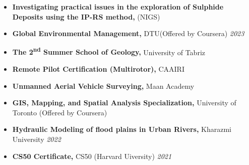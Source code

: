 \documentclass[letterpaper,11pt]{article}
\begin{document}
		\vspace{-1.2em}
		\begin{itemize}[left=0pt, label={}, topsep=7.5pt, partopsep=0pt, itemsep=6pt, parsep=0pt]
			\item \textbf{Investigating practical issues in the exploration of Sulphide Deposits using the IP-RS method,} (NIGS)\footnotemark[1]
		\end{itemize}
		\vspace{-1.2em}
		\begin{itemize}[left=0pt, label={}, topsep=7.5pt, partopsep=0pt, itemsep=6pt, parsep=0pt]
			\item \textbf{Global Environmental Management,} DTU\footnotemark[2] (Offered by Coursera)  \hfill \textit{2023}
		\end{itemize}
		\vspace{-1.2em}
		\begin{itemize}[left=0pt, label={}, topsep=7.5pt, partopsep=0pt, itemsep=6pt, parsep=0pt]
			\item \textbf{The 2\textsuperscript{nd} Summer School of Geology,} University of Tabriz\hfill \textit{}
		\end{itemize}
		\vspace{-1.2em}
		\begin{itemize}[left=0pt, label={}, topsep=7.5pt, partopsep=0pt, itemsep=6pt, parsep=0pt]
			\item \textbf{Remote Pilot Certification (Multirotor),} CAAIRI\footnotemark[3] \hfill \textit{}
		\end{itemize}
		\vspace{-1.2em}
		\begin{itemize}[left=0pt, label={}, topsep=7.5pt, partopsep=0pt, itemsep=6pt, parsep=0pt]
			\item \textbf{Unmanned Aerial Vehicle Surveying,} Maan Academy  \hfill \textit{}
		\end{itemize}
		\vspace{-1.2em}
		\begin{itemize}[left=0pt, label={}, topsep=7.5pt, partopsep=0pt, itemsep=6pt, parsep=0pt]
			\item \textbf{GIS, Mapping, and Spatial Analysis Specialization,} University of Toronto (Offered by Coursera) \hfill \textit{}
		\end{itemize}
		\vspace{-1.2em}
		\begin{itemize}[left=0pt, label={}, topsep=7.5pt, partopsep=0pt, itemsep=6pt, parsep=0pt]
			\item \textbf{Hydraulic Modeling of flood plains in Urban Rivers,}  Kharazmi University \hfill \textit{2022}
		\end{itemize}
		\vspace{-1.2em}
		\begin{itemize}[left=0pt, label={}, topsep=7.5pt, partopsep=0pt, itemsep=6pt, parsep=0pt]
			\item \textbf{CS50 Certificate,}  CS50 (Harvard Uiversity) \hfill \textit{2021}
		\end{itemize}
		\vspace{-1.2em}
		
\end{document}
